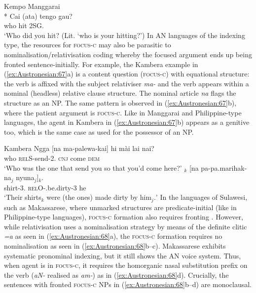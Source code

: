 \documentclass[output=paper,chinesefont]{../langscibook}
\begin{document}
\ea\label{ex:Austronesian:66} Kempo Manggarai \citep{Semiun1993}\\*
\gll
Cai (ata) tengo gau? \\
who {\REL} hit 2SG.\GEN\\
\glt`Who did you hit? (Lit. `who is your hitting?')
\z
In AN languages of the indexing type, the resources for \textsc{focus-c} may also be parasitic to nominalisation/relativisation coding whereby the focused argument ends up being fronted sentence-initially. For example, the Kambera  example in (\ref{ex:Austronesian:67}a) is a content question (\textsc{focus-c}) with equational structure: the verb is affixed with the subject relativiser \emph{ma-} and the verb appears within a nominal (headless) relative clause structure. The nominal article \emph{na} flags the structure as an NP. The same pattern is observed in (\ref{ex:Austronesian:67}b), where the patient argument is \textsc{focus-c}. Like in Manggarai and Philippine-type languages, the agent in Kambera in (\ref{ex:Austronesian:67}b) appears as a genitive too, which is the same case as used for the possessor of an NP.

\newpage
\ea\label{ex:Austronesian:67} Kambera  \citep[132, 318]{Klamer1998}
\ea\gll
Ngga [na ma-palewa-kai] hi mài lai nai? \\
 who \phantom{[}{\ART} \textsc{relS}-send-\textsc{2\PL.\ACC} \textsc{cnj} come {\LOC} \textsc{dem}\\
\glt`Who was the one that send you so that you'd come here?'
\ex\gll
[Da kalembi-da]$_k$ [na pa-pa.marihak-na$_j$ nyuna$_j$]\textsubscript{\SUBJ}$_k$.\\
\phantom{[}{\ART} shirt-3{\PL.\POSS} \phantom{[[}{\ART} \textsc{relO}-\CAUS.be.dirty-{3\SG} he\\
\glt`Their shirts$_k$ were (the ones) made dirty by him$_j.$'
\z\z
In the languages of Sulawesi, such as Makassarese, where unmarked structures are predicate-initial (like in Philippine-type languages), \textsc{focus-c} formation also requires fronting \citep[341--345]{Jukes2006}. However, while relativisation uses a nominalisation strategy by means of the definite clitic \emph{=a} as seen in (\ref{ex:Austronesian:68}a), the \textsc{focus-c} formation requires no nominalisation as seen in (\ref{ex:Austronesian:68}b--c). Makassarese exhibits systematic pronominal indexing, but it still shows the AN voice system. Thus, when agent \SUBJ is in \textsc{focus-c}, it requires the homorganic nasal substitution \AV prefix on the verb (\emph{aN-} realised as \emph{am-}) as in (\ref{ex:Austronesian:68}d). Crucially, the sentences with fronted \textsc{focus-c} NPs in (\ref{ex:Austronesian:68}b--d) are monoclausal.
\end{document}
